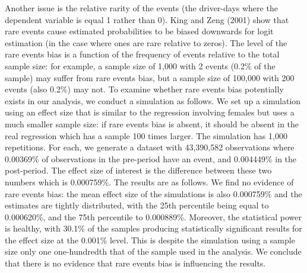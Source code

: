 Another issue is the relative rarity of the events (the driver-days where the dependent variable is equal 1 rather than 0). King and Zeng (2001) show that rare events cause estimated probabilities to be biased downwards for logit estimation (in the case where ones are rare relative to zeros). The level of the rare events bias is a function of the frequency of events relative to the total sample size: for example, a sample size of 1,000 with 2 events (0.2\% of the sample) may suffer from rare events bias, but a sample size of 100,000 with 200 events (also 0.2\%) may not. To examine whether rare events bias potentially exists in our analysis, we conduct a simulation as follows. We set up a simulation using an effect size that is similar to the regression involving females but uses a much smaller sample size: if rare events bias is absent, it should be absent in the real regression which has a sample 100 times larger. The simulation has 1,000 repetitions. For each, we generate a dataset with 43,390,582 observations where 0.00369\% of observations in the pre-period have an event, and 0.004449\% in the post-period. The effect size of interest is the difference between these two numbers which is 0.000759\%. The results are as follows. We find no evidence of rare events bias: the mean effect size of the simulations is also 0.000759\% and the estimates are tightly distributed, with the 25th percentile being equal to 0.000620\%, and the 75th percentile to 0.000889\%. Moreover, the statistical power is healthy, with 30.1\% of the samples producing statistically significant results for the effect size at the 0.001\% level. This is despite the simulation using a sample size only one one-hundredth that of the sample used in the analysis. We conclude that there is no evidence that rare events bias is influencing the results.

